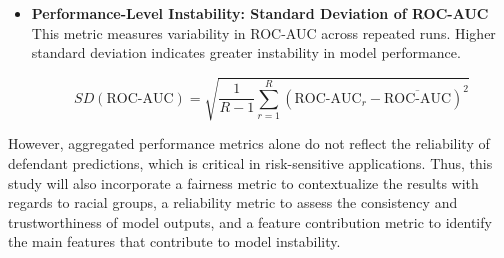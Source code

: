 \documentclass[12pt]{article}
\begin{document}
\begin{itemize}
  To calculate for the ROC-AUC per run $r$ of a model, we use the formula:
  \[ \text{ROC-AUC}_r = \sum_{t=1}^{T} (\text{FPR}_t - \text{FPR}_{t-1}) \cdot \text{TPR}_t \]
  which uses a discrete approximation of the area under the ROC curve across thresholds.

  \item \textbf{Performance-Level Instability: Standard Deviation of ROC-AUC} \\
  \tab This metric measures variability in ROC-AUC across repeated runs. Higher standard deviation indicates greater instability in model performance.

  \[ SD(\text{ROC-AUC})=\sqrt{\frac{1}{R-1}\sum_{r=1}^{R}(\text{ROC-AUC}_r-\overline{\text{ROC-AUC}})^2} \]
\end{itemize}

However, aggregated performance metrics alone do not reflect the reliability of  defendant predictions, which is critical in risk-sensitive applications. Thus, this study will also incorporate a fairness metric to contextualize the results with regards to racial groups, a reliability metric to assess the consistency and trustworthiness of model outputs, and a feature contribution metric to identify the main features that contribute to model instability. 
\end{document}
